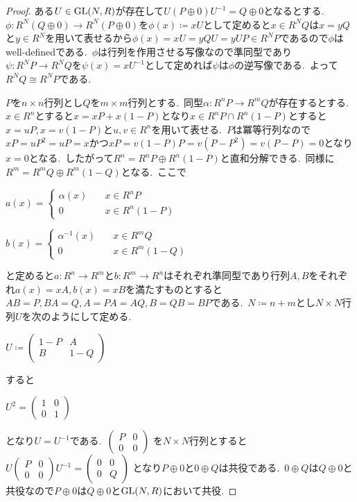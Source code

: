 \begin{proof}
ある$U \in \operatorname{GL}(N, R)$が存在して$U(P \oplus 0)U^{-1} = Q \oplus 0$となるとする.\
$\phi \colon R^N (Q \oplus 0) \to R^N (P \oplus 0)$を$\phi(x) \coloneq xU$として定めると$x \in R^N Q$は$x = yQ$と$y \in R^N$を用いて表せるから$\phi(x) = xU = yQU = yUP \in R^NP$であるので$\phi$はwell-definedである.\
$\phi$は行列を作用させる写像なので準同型であり$\psi \colon R^N P \to R^N Q$を$\psi(x) = xU^{-1}$として定めれば$\psi$は$\phi$の逆写像である.\
よって$R^N Q \cong R^N P$である.

$P$を$n \times n$行列とし$Q$を$m \times m$行列とする.\
同型$\alpha \colon R^n P \to R^m Q$が存在するとする.\
$x \in R^n$とすると$x = xP + x(1 - P)$となり$x \in R^nP \cap R^n(1 - P)$とすると$x = uP, x = v(1 - P)$と$u,v \in R^n$を用いて表せる.\
$P$は冪等行列なので$xP = uP^2 = uP = x$かつ$xP = v(1 - P)P = v(P - P^2) = v(P - P) = 0$となり$x = 0$となる.\
したがって$R^n = R^n P \oplus R^n (1 - P)$と直和分解できる.\
同様に$R^m = R^m Q \oplus R^m (1 - Q)$となる.\
ここで
\begin{center}
$a(x) =
\begin{cases}
  \alpha(x) \quad & x \in R^n P\\
  0 \quad & x \in R^n (1 - P)
\end{cases}
$
\end{center}

\begin{center}
$b(x) =
\begin{cases}
  \alpha^{-1}(x) \quad & x \in R^m Q\\
  0 \quad & x \in R^m (1 - Q)
\end{cases}
$
\end{center}
と定めると$a \colon R^n \to R^m$と$b \colon R^m \to R^n$はそれぞれ準同型であり行列$A,B$をそれぞれ$a(x) = xA, b(x) = xB$を満たすものとすると$AB = P, BA = Q, A = PA = AQ, B = QB = BP$である.\
$N \coloneq n + m$とし$N \times N$行列$U$を次のようにして定める.
\begin{center}
$U \coloneq
\begin{pmatrix}
   1 - P & A \\
   B & 1 - Q
\end{pmatrix}
$
\end{center}
すると
\begin{center}
$
U^2 =
\begin{pmatrix}
   1 & 0 \\
   0 & 1
\end{pmatrix}
$
\end{center}
となり$U = U^{-1}$である.\
$\begin{pmatrix}
   P & 0 \\
   0 & 0
\end{pmatrix}$
を$N \times N$行列とすると$U
\begin{pmatrix}
   P & 0 \\
   0 & 0
\end{pmatrix}
U^{-1} =
\begin{pmatrix}
   0 & 0 \\
   0 & Q
\end{pmatrix}
$
となり$P \oplus 0$と$0 \oplus Q$は共役である.\
$0 \oplus Q$は$Q \oplus 0$と共役なので$P \oplus 0$は$Q \oplus 0$と$\operatorname{GL}(N,R)$において共役.
\end{proof}

